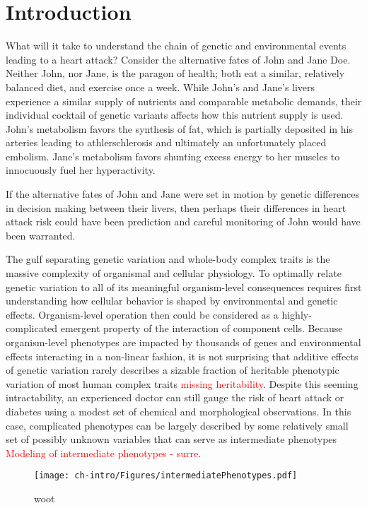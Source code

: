 
\chapter{Introduction\label{ch:intro}}

What will it take to understand the chain of genetic and environmental events leading to a heart attack? Consider the alternative fates of John and Jane Doe.  Neither John, nor Jane, is the paragon of health; both eat a similar, relatively balanced diet, and exercise once a week.  While John's and Jane's livers experience a similar supply of nutrients and comparable metabolic demands, their individual cocktail of genetic variants affects how this nutrient supply is used.  John's metabolism favors the synthesis of fat, which is partially deposited in his arteries leading to athlerschlerosis and ultimately an unfortunately placed embolism.  Jane's metabolism favors shunting excess energy to her muscles to innocuously fuel her hyperactivity.

If the alternative fates of John and Jane were set in motion by genetic differences in decision making between their livers, then perhaps their differences in heart attack risk could have been prediction and careful monitoring of John would have been warranted.


The gulf separating genetic variation and whole-body complex traits is the massive complexity of organismal and cellular physiology.  To optimally relate genetic variation to all of its meaningful organism-level consequences requires first understanding how cellular behavior is shaped by environmental and genetic effects.  Organism-level operation then could be considered as a highly-complicated emergent property of the interaction of component cells. Because organism-level phenotypes are impacted by thousands of genes and environmental effects interacting in a non-linear fashion, it is not surprising that additive effects of genetic variation rarely describes a sizable fraction of heritable phenotypic variation of most human complex traits \textcolor{red}{missing heritability}. Despite this seeming intractability, an experienced doctor can still gauge the risk of heart attack or diabetes using a modest set of chemical and morphological observations.  In this case, complicated phenotypes can be largely described by some relatively small set of possibly unknown variables that can serve as intermediate phenotypes \textcolor{red}{Modeling of intermediate phenotypes - surre}.

\begin{figure}[h!]
\begin{center}
\texttt{[image: ch-intro/Figures/intermediatePhenotypes.pdf]}
\end{center}
\caption{woot}
\label{fig:intpheno}
\end{figure}


